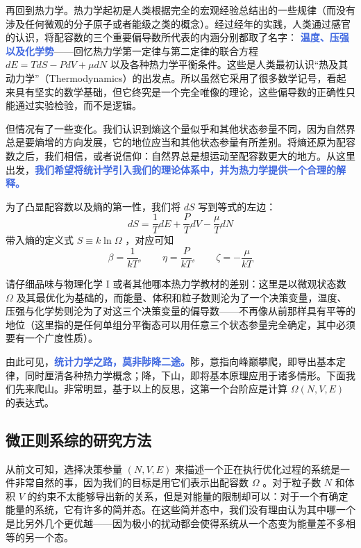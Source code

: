\documentclass[hyperref,UTF-8]{ctexbook}
\newcommand{\0}{\boldsymbol{0}}
\begin{document}
再回到热力学。热力学起初是人类根据完全的宏观经验总结出的一些规律（而没有涉及任何微观的分子原子或者能级之类的概念）。经过经年的实践，人类通过感官的认识，将配容数的三个重要偏导数所代表的内涵分别都取了名字： \textcolor{RoyalBlue}{\textbf{\kaishu 温度、压强以及化学势}}——回忆热力学第一定律与第二定律的联合方程 $dE = TdS - PdV+ \mu dN$ 以及各种热力学平衡条件。这些是人类最初认识“热及其动力学”（Thermodynamics）的出发点。所以虽然它采用了很多数学记号，看起来具有坚实的数学基础，但它终究是一个完全唯像的理论，这些偏导数的正确性只能通过实验检验，而不是逻辑。

但情况有了一些变化。我们认识到熵这个量似乎和其他状态参量不同，因为自然界总是要熵增的方向发展，它的地位应当和其他状态参量有所差别。将熵还原为配容数之后，我们相信，或者说信仰：自然界总是想运动至配容数更大的地方。从这里出发，\textcolor{RoyalBlue}{\textbf{\kaishu 我们希望将统计学引入我们的理论体系中，并为热力学提供一个合理的解释。}} 

为了凸显配容数以及熵的第一性，我们将 $dS$ 写到等式的左边：
\begin{equation}
    dS = \frac{1}{T} dE + \frac{P}{T} dV - \frac{\mu}{T} dN
\end{equation}
带入熵的定义式 $S \equiv k\ln \Omega$ ，对应可知
\begin{equation}
    \beta = \frac{1}{kT} ,\quad\quad \eta = \frac{P}{kT} ,\quad\quad \zeta = -\frac{\mu}{kT} 
\end{equation}

请仔细品味与物理化学 I 或者其他哪本热力学教材的差别：这里是以微观状态数 $\Omega$ 及其最优化为基础的，而能量、体积和粒子数则沦为了一个决策变量，温度、压强与化学势则沦为了对这三个决策变量的偏导数——不再像从前那样具有平等的地位（这里指的是任何单组分平衡态可以用任意三个状态参量完全确定，其中必须要有一个广度性质）。

由此可见，\textcolor{RoyalBlue}{\textbf{\kaishu 统计力学之路，莫非陟降二途。}}陟，意指向峰巅攀爬，即导出基本定律，同时厘清各种热力学概念；降，下山，即将基本原理应用于诸多情形。下面我们先来爬山。非常明显，基于以上的反思，这第一个台阶应是计算 $\Omega (N,V,E)$ 的表达式。 


\subsection{微正则系综的研究方法}

从前文可知，选择决策参量 $(N,V,E)$ 来描述一个正在执行优化过程的系统是一件非常自然的事，因为我们的目标是用它们表示出配容数 $\Omega$ 。对于粒子数 $N$ 和体积 $V$ 的约束不太能够导出新的关系，但是对能量的限制却可以：对于一个有确定能量的系统，它有许多的简并态。在这些简并态中，我们没有理由认为其中哪一个是比另外几个更优越——因为极小的扰动都会使得系统从一个态变为能量差不多相等的另一个态。
\end{document}
